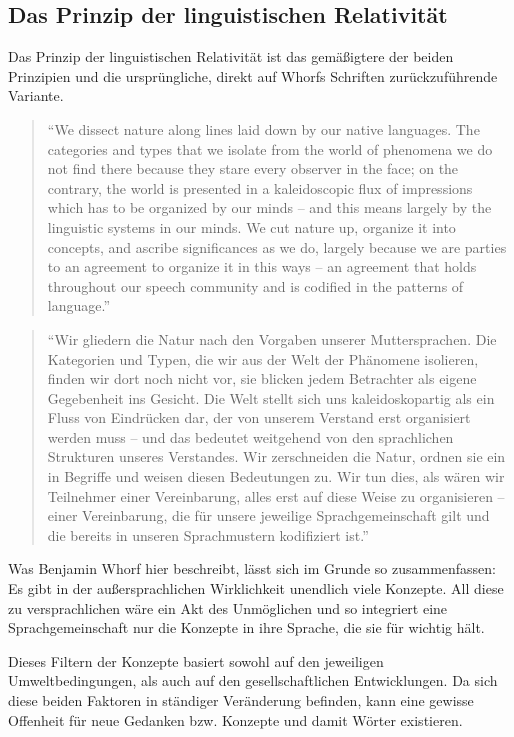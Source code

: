 \documentclass[12pt]{scrreprt}
\begin{document}
		\subsection{Das Prinzip der linguistischen Relativität}
		\label{sec:sawo_lingrelativ}
		Das Prinzip der linguistischen Relativität ist das gemäßigtere der beiden
		Prinzipien und die ursprüngliche, direkt auf Whorfs Schriften
		zurückzuführende Variante.
		\blockquote{
			\enquote{We dissect nature along lines laid down by our native languages. The
			categories and types that we isolate from the world of phenomena we do not
			find there because they stare every observer in the face; on the contrary,
			the world is presented in a kaleidoscopic flux of impressions which has to
			be organized by our minds – and this means largely by the linguistic systems
			in our minds. We cut nature up, organize it into concepts, and ascribe
			significances as we do, largely because we are parties to an agreement to
			organize it in this ways – an agreement that holds throughout our speech
			community and is codified in the patterns of language.}\autocite{article:Science_and_linguistics}
		}
		\blockquote{
			\enquote{Wir gliedern die Natur nach den Vorgaben unserer Muttersprachen. Die
			Kategorien und Typen, die wir aus der Welt der Phänomene isolieren, finden
			wir dort noch nicht vor, sie blicken jedem Betrachter als eigene Gegebenheit
			ins Gesicht. Die Welt stellt sich uns kaleidoskopartig als ein Fluss von
			Eindrücken dar, der von unserem Verstand erst organisiert werden muss – und
			das bedeutet weitgehend von den sprachlichen Strukturen unseres Verstandes.
			Wir zerschneiden die Natur, ordnen sie ein in Begriffe und weisen diesen
			Bedeutungen zu. Wir tun dies, als wären wir Teilnehmer einer Vereinbarung,
			alles erst auf diese Weise zu organisieren – einer Vereinbarung, die für
			unsere jeweilige Sprachgemeinschaft gilt und die bereits in unseren
			Sprachmustern kodifiziert ist.}\autocite{article:Science_and_linguistics}
		}
		Was Benjamin Whorf hier beschreibt, lässt sich im Grunde so zusammenfassen:
		\smallskip\newline
		Es gibt in der außersprachlichen Wirklichkeit unendlich viele Konzepte. All
		diese zu versprachlichen wäre ein Akt des Unmöglichen und so integriert eine
		Sprachgemeinschaft nur die Konzepte in ihre Sprache, die sie für wichtig
		hält.

		Dieses Filtern der Konzepte basiert sowohl auf den jeweiligen
		Umweltbedingungen, als auch auf den gesellschaftlichen Entwicklungen.
		Da sich diese beiden Faktoren in ständiger Veränderung befinden, kann eine
		gewisse Offenheit für neue Gedanken bzw. Konzepte und damit Wörter
		existieren.\autocite{wiki:Sapir-Whorf-Hypothese}
\end{document}
